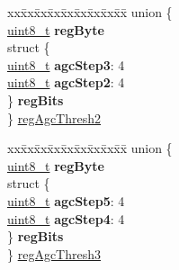 \begin{DoxyCompactItemize}
\begin{tabbing}
\end{tabbing}\item 
\begin{tabbing}
xx\=xx\=xx\=xx\=xx\=xx\=xx\=xx\=xx\=\kill
union \{\\
\>\hyperlink{vl53l0x__types_8h_aba7bc1797add20fe3efdf37ced1182c5}{uint8\_t} {\bfseries regByte}\\
\>struct \{\\
\>\>\hyperlink{vl53l0x__types_8h_aba7bc1797add20fe3efdf37ced1182c5}{uint8\_t} {\bfseries agcStep3}: 4\\
\>\>\hyperlink{vl53l0x__types_8h_aba7bc1797add20fe3efdf37ced1182c5}{uint8\_t} {\bfseries agcStep2}: 4\\
\>\} {\bfseries regBits}\\
\} \hyperlink{structFSK__Register__Map_a254ebf89525de4ef4174b4b59739edab}{regAgcThresh2}\\

\end{tabbing}\item 
\begin{tabbing}
xx\=xx\=xx\=xx\=xx\=xx\=xx\=xx\=xx\=\kill
union \{\\
\>\hyperlink{vl53l0x__types_8h_aba7bc1797add20fe3efdf37ced1182c5}{uint8\_t} {\bfseries regByte}\\
\>struct \{\\
\>\>\hyperlink{vl53l0x__types_8h_aba7bc1797add20fe3efdf37ced1182c5}{uint8\_t} {\bfseries agcStep5}: 4\\
\>\>\hyperlink{vl53l0x__types_8h_aba7bc1797add20fe3efdf37ced1182c5}{uint8\_t} {\bfseries agcStep4}: 4\\
\>\} {\bfseries regBits}\\
\} \hyperlink{structFSK__Register__Map_a391c957c12b3a7c63faa1788e4553704}{regAgcThresh3}\\


\end{tabbing}
\end{DoxyCompactItemize}
